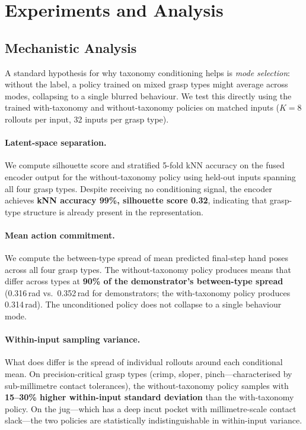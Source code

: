 \documentclass[11pt]{article}
\begin{document}
\section{Experiments and Analysis}
\subsection{Mechanistic Analysis}
\label{sec:mechanistic}

A standard hypothesis for why taxonomy conditioning helps is \emph{mode selection}:
without the label, a policy trained on mixed grasp types might average across modes,
collapsing to a single blurred behaviour. We test this directly using the trained
with-taxonomy and without-taxonomy policies on matched inputs ($K=8$ rollouts per input,
32 inputs per grasp type).

\paragraph{Latent-space separation.}
We compute silhouette score and stratified 5-fold kNN accuracy on the fused encoder
output for the without-taxonomy policy using held-out inputs spanning all four grasp
types. Despite receiving no conditioning signal, the encoder achieves \textbf{kNN
accuracy 99\%, silhouette score 0.32}, indicating that grasp-type structure is already
present in the representation.

\paragraph{Mean action commitment.}
We compute the between-type spread of mean predicted final-step hand poses across all
four grasp types. The without-taxonomy policy produces means that differ across types
at \textbf{90\% of the demonstrator's between-type spread}
(0.316\,rad vs.\ 0.352\,rad for demonstrators; the with-taxonomy policy produces
0.314\,rad). The unconditioned policy does not collapse to a single behaviour mode.

\paragraph{Within-input sampling variance.}
What does differ is the spread of individual rollouts around each conditional mean. On
precision-critical grasp types (crimp, sloper, pinch---characterised by sub-millimetre
contact tolerances), the without-taxonomy policy samples with \textbf{15--30\% higher
within-input standard deviation} than the with-taxonomy policy. On the jug---which has
a deep incut pocket with millimetre-scale contact slack---the two policies are
statistically indistinguishable in within-input variance.
\end{document}
